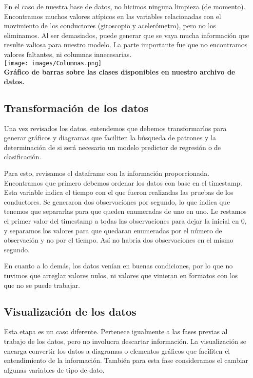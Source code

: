 \documentclass{article}
\begin{document}
        En el caso de nuestra base de datos, no hicimos ninguna limpieza (de momento). Encontramos muchos valores atípicos en las variables relacionadas con el movimiento de los conductores (giroscopio y acelerómetro), pero no los eliminamos. Al ser demasiados, puede generar que se vaya mucha información que resulte valiosa para nuestro modelo. La parte importante fue que no encontramos valores faltantes, ni columnas innecesarias. \\

        \texttt{[image: images/Columnas.png]} \\

        \textbf{Gráfico de barras sobre las clases disponibles en nuestro archivo de datos.} \\

    \subsection{Transformación de los datos}

        Una vez revisados los datos, entendemos que debemos transformarlos para generar gráficos y diagramas que faciliten la búsqueda de patrones y la determinación de si será necesario un modelo predictor de regresión o de clasificación.
        
        Para esto, revisamos el dataframe con la información proporcionada. Encontramos que primero debemos ordenar los datos con base en el timestamp. Esta variable indica el tiempo con el que fueron realizadas las pruebas de los conductores. Se generaron dos observaciones por segundo, lo que indica que tenemos que separarlas para que queden enumeradas de uno en uno. Le restamos el primer valor del timestamp a todas las observaciones para dejar la inicial en 0, y separamos los valores para que quedaran enumeradas por el número de observación y no por el tiempo. Así no habría dos observaciones en el mismo segundo.
        
        En cuanto a lo demás, los datos venían en buenas condiciones, por lo que no tuvimos que arreglar valores nulos, ni valores que vinieran en formatos con los que no se puede trabajar.

    \subsection{Visualización de los datos}

       Esta etapa es un caso diferente. Pertenece igualmente a las fases previas al trabajo de los datos, pero no involucra descartar información. La visualización se encarga convertir los datos a diagramas o elementos gráficos que faciliten el entendimiento de la información. También para esta fase consideramos el cambiar algunas variables de tipo de dato.
\end{document}
